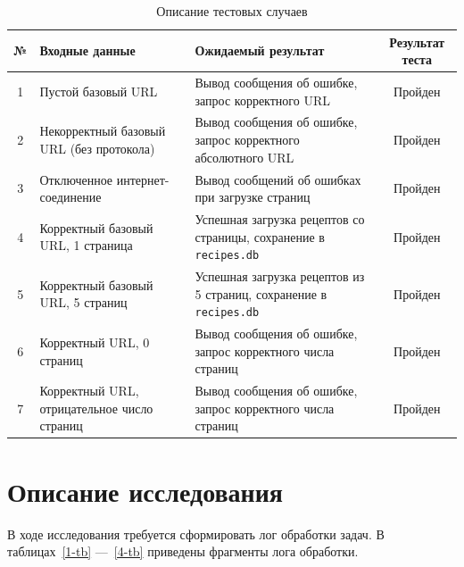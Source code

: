\begin{table}[h!]
\begin{center}
\begin{threeparttable}
\caption{Описание тестовых случаев}
\captionsetup{justification=raggedright, singlelinecheck=false}
\label{tbl}
\begin{tabular}{|c|p{6cm}|p{6cm}|c|}
    \hline 
    \textbf{№} & \textbf{Входные данные} & \textbf{Ожидаемый результат} & \textbf{Результат теста} \\
    \hline 
    1 & Пустой базовый URL & Вывод сообщения об ошибке, запрос корректного URL & Пройден \\
    \hline 
    2 & Некорректный базовый URL (без протокола) & Вывод сообщения об ошибке, запрос корректного абсолютного URL & Пройден \\
    \hline 
    3 & Отключенное интернет-соединение & Вывод сообщений об ошибках при загрузке страниц & Пройден \\
    \hline 
    4 & Корректный базовый URL, 1 страница & Успешная загрузка рецептов со страницы, сохранение в \texttt{recipes.db} & Пройден \\
    \hline 
    5 & Корректный базовый URL, 5 страниц & Успешная загрузка рецептов из 5 страниц, сохранение в \texttt{recipes.db} & Пройден \\
    \hline 
    6 & Корректный URL, 0 страниц & Вывод сообщения об ошибке, запрос корректного числа страниц & Пройден \\
    \hline 
    7 & Корректный URL, отрицательное число страниц & Вывод сообщения об ошибке, запрос корректного числа страниц & Пройден \\
    \hline 
\end{tabular}
\end{threeparttable}
\end{center}
\end{table}

\clearpage

\chapter{Описание исследования}

В ходе исследования требуется сформировать лог обработки задач. В таблицах~\ref{1-tb} ---~\ref{4-tb} приведены фрагменты лога обработки. 

